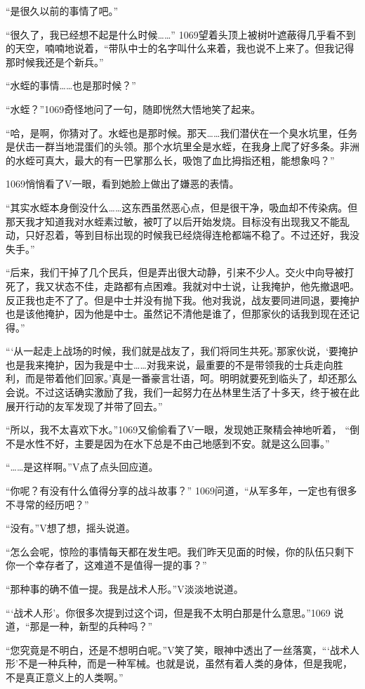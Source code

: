 “是很久以前的事情了吧。”

“很久了，我已经想不起是什么时候……” 1069望着头顶上被树叶遮蔽得几乎看不到的天空，喃喃地说着，“带队中士的名字叫什么来着，我也说不上来了。但我记得那时候我还是个新兵。”

“水蛭的事情……也是那时候？”

“水蛭？”1069奇怪地问了一句，随即恍然大悟地笑了起来。

“哈，是啊，你猜对了。水蛭也是那时候。那天……我们潜伏在一个臭水坑里，任务是伏击一群当地混蛋们的头领。那个水坑里全是水蛭，在我身上爬了好多条。非洲的水蛭可真大，最大的有一巴掌那么长，吸饱了血比拇指还粗，能想象吗？”

1069悄悄看了V一眼，看到她脸上做出了嫌恶的表情。

“其实水蛭本身倒没什么……这东西虽然恶心点，但是很干净，吸血却不传染病。但那天我才知道我对水蛭素过敏，被叮了以后开始发烧。目标没有出现我又不能乱动，只好忍着，等到目标出现的时候我已经烧得连枪都端不稳了。不过还好，我没失手。”

“后来，我们干掉了几个民兵，但是弄出很大动静，引来不少人。交火中向导被打死了，我又状态不佳，走路都有点困难。我就对中士说，让我掩护，他先撤退吧。反正我也走不了了。但是中士并没有抛下我。他对我说，战友要同进同退，要掩护也是该他掩护，因为他是中士。虽然记不清他是谁了，但那家伙的话我到现在还记得。”

“‘从一起走上战场的时候，我们就是战友了，我们将同生共死。’那家伙说，‘要掩护也是我来掩护，因为我是中士……对我来说，最重要的不是带领我的士兵走向胜利，而是带着他们回家。’真是一番豪言壮语，呵。明明就要死到临头了，却还那么会说。不过这话确实激励了我，我们一起努力在丛林里生活了十多天，终于被在此展开行动的友军发现了并带了回去。”

“所以，我不太喜欢下水。”1069又偷偷看了V一眼，发现她正聚精会神地听着， “倒不是水性不好，主要是因为在水下总是不由己地感到不安。就是这么回事。”

“……是这样啊。”V点了点头回应道。

“你呢？有没有什么值得分享的战斗故事？” 1069问道，“从军多年，一定也有很多不寻常的经历吧？”

“没有。”V想了想，摇头说道。

“怎么会呢，惊险的事情每天都在发生吧。我们昨天见面的时候，你的队伍只剩下你一个幸存者了，这难道不是值得一提的事？”

“那种事的确不值一提。我是战术人形。”V淡淡地说道。

“‘战术人形’。你很多次提到过这个词，但是我不太明白那是什么意思。”1069 说道，“那是一种，新型的兵种吗？”

“您究竟是不明白，还是不想明白呢。”V笑了笑，眼神中透出了一丝落寞，“‘战术人形’不是一种兵种，而是一种军械。也就是说，虽然有着人类的身体，但是我呢，不是真正意义上的人类啊。”


